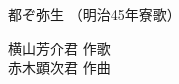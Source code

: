 \documentclass[10pt,b5j]{tarticle} %
\begin{document}
\begin{minipage}[c]{0.7\hsize} %
    \begin{center}
        {\LARGE
            都ぞ弥生 %
        }
        {\small 
            （明治45年寮歌） %
        }
    \end{center}
\end{minipage}
\begin{minipage}[c]{0.3\hsize} %
    \begin{flushright} %
        横山芳介君 作歌\\赤木顕次君 作曲 %
    \end{flushright}
\end{minipage}
\end{document}
